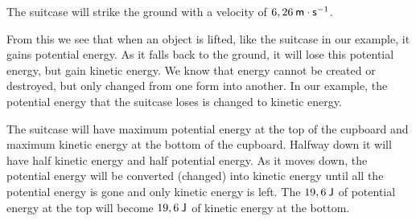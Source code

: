         \label{m38786*id69118}The suitcase will strike the ground with a velocity of $6,26\phantom{\rule{2pt}{0ex}}\mathsf{m}\ensuremath{\cdot}\mathsf{s}{}^{-1}$.\par 
        \label{m38786*id69148}From this we see that when an object is lifted, like the suitcase in our example, it gains potential energy. As it falls back to the ground, it will lose this potential energy, but gain kinetic energy. We know that energy cannot be created or destroyed, but only changed from one form into another. In our example, the potential energy that the suitcase loses is changed to kinetic energy.\par 
        \label{m38786*id69157}The suitcase will have maximum potential energy at the top of the cupboard and maximum kinetic energy at the bottom of the cupboard. Halfway down it will have half kinetic energy and half potential energy. As it moves down, the potential energy will be converted (changed) into kinetic energy until all the potential energy is gone and only kinetic energy is left. The $19,6\phantom{\rule{2pt}{0ex}}\mathsf{J}$ of potential energy at the top will become $19,6\phantom{\rule{2pt}{0ex}}\mathsf{J}$ of kinetic energy at the bottom.\par 
\label{m38786*secfhsst!!!underscore!!!id1898}\vspace{.5cm} 
      \noindent
